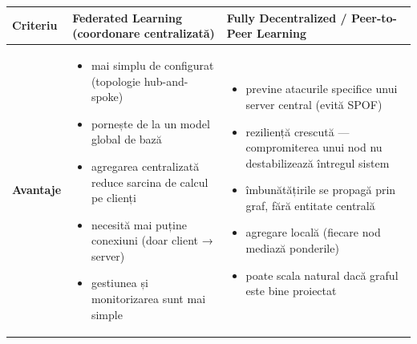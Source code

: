 \documentclass[../../main.tex]{subfiles}
\begin{document}
\begin{table}[h]
    \centering
    \footnotesize
    \begin{tabular}{ | p{} | p{} | p{} | }
        \hline
        \textbf{Criteriu} & \textbf{Federated Learning} (coordonare centralizată) & \textbf{Fully Decentralized / Peer-to-Peer Learning} \\
        \hline

        \textbf{Avantaje}
        &
        \begin{itemize}[noitemsep, topsep=2pt, leftmargin=*]
            \item mai simplu de configurat (topologie hub-and-spoke)
            \item pornește de la un model global de bază
            \item agregarea centralizată reduce sarcina de calcul pe clienți
            \item necesită mai puține conexiuni (doar client → server)
            \item gestiunea și monitorizarea sunt mai simple
        \end{itemize}
        &
        \begin{itemize}[noitemsep, topsep=2pt, leftmargin=*]
            \item previne atacurile specifice unui server central (evită SPOF)
            \item reziliență crescută --- compromiterea unui nod nu destabilizează întregul sistem
            \item îmbunătățirile se propagă prin graf, fără entitate centrală
            \item agregare locală (fiecare nod mediază ponderile)
            \item poate scala natural dacă graful este bine proiectat
        \end{itemize}
        \\
        \hline


\end{tabular}
\end{table}
\end{document}
